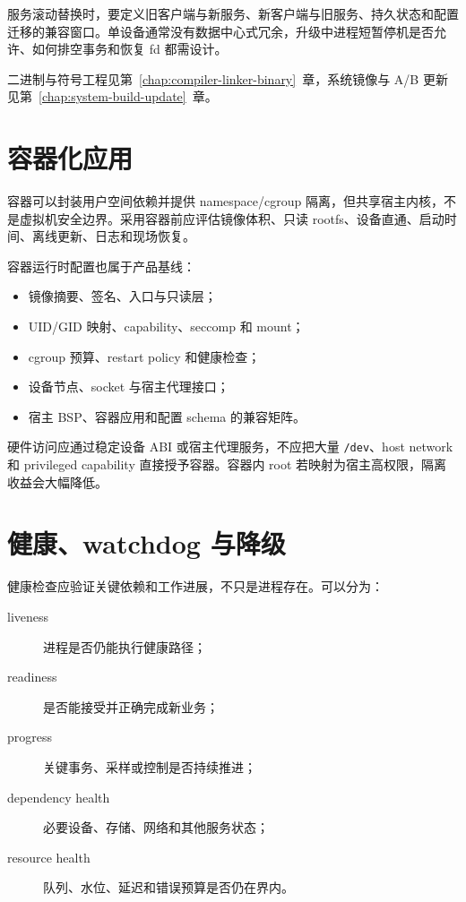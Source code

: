 服务滚动替换时，要定义旧客户端与新服务、新客户端与旧服务、持久状态和配置迁移的兼容窗口。单设备通常没有数据中心式冗余，升级中进程短暂停机是否允许、如何排空事务和恢复 fd 都需设计。

二进制与符号工程见第~\ref{chap:compiler-linker-binary}~章，系统镜像与 A/B 更新见第~\ref{chap:system-build-update}~章。

\section{容器化应用}

容器可以封装用户空间依赖并提供 namespace/cgroup 隔离，但共享宿主内核，不是虚拟机安全边界。采用容器前应评估镜像体积、只读 rootfs、设备直通、启动时间、离线更新、日志和现场恢复。

容器运行时配置也属于产品基线：

\begin{itemize}
  \item 镜像摘要、签名、入口与只读层；
  \item UID/GID 映射、capability、seccomp 和 mount；
  \item cgroup 预算、restart policy 和健康检查；
  \item 设备节点、socket 与宿主代理接口；
  \item 宿主 BSP、容器应用和配置 schema 的兼容矩阵。
\end{itemize}

硬件访问应通过稳定设备 ABI 或宿主代理服务，不应把大量 \texttt{/dev}、host network 和 privileged capability 直接授予容器。容器内 root 若映射为宿主高权限，隔离收益会大幅降低。

\section{健康、watchdog 与降级}

健康检查应验证关键依赖和工作进展，不只是进程存在。可以分为：

\begin{description}
  \item[liveness] 进程是否仍能执行健康路径；
  \item[readiness] 是否能接受并正确完成新业务；
  \item[progress] 关键事务、采样或控制是否持续推进；
  \item[dependency health] 必要设备、存储、网络和其他服务状态；
  \item[resource health] 队列、水位、延迟和错误预算是否仍在界内。
\end{description}

